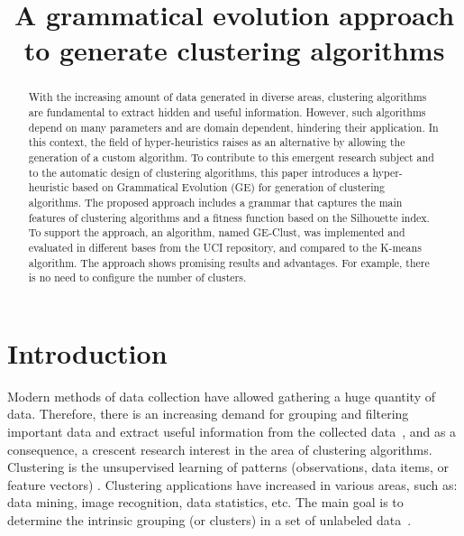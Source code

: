 \documentclass[conference]{IEEEtran}
\begin{document}
	
	\title{A grammatical evolution approach to generate clustering algorithms}
	
	
	\author{
		
		
		
	}
	
	\maketitle
	
	\begin{abstract} 
		
		With the increasing amount of data generated in diverse areas, clustering algorithms are fundamental to extract hidden and useful information. However, such algorithms depend on many parameters and are domain dependent, hindering their application. In this context, the field of hyper-heuristics raises as an alternative by allowing the generation of a custom algorithm. To contribute to this emergent research subject and to the automatic design of clustering algorithms, this paper introduces a hyper-heuristic based on Grammatical Evolution (GE) for generation of clustering algorithms. The proposed approach includes a grammar that captures the main features of clustering algorithms and a fitness function based on the Silhouette index. To support the approach, an algorithm, named GE-Clust, was implemented and evaluated in different bases from the UCI repository, and compared to the K-means algorithm. The approach  shows promising results  and advantages. For example, there is no need to configure the number of clusters.
	\end{abstract}
	
	
	\IEEEpeerreviewmaketitle
	
	
	\section{Introduction}
	
	
	Modern methods of data collection have allowed gathering a huge quantity of data. Therefore, there is an increasing demand for grouping and filtering important data and extract useful information from the collected data~\cite{ahalya2015data}, and as a consequence, a crescent research interest in the area of clustering algorithms. Clustering is the unsupervised learning of patterns (observations, data items, or feature vectors) \cite{jain1988algorithms}. Clustering applications have increased in various areas, such as: data mining, image recognition, data statistics, etc. The main goal is to determine the intrinsic grouping (or clusters) in a set of unlabeled data~\cite{ahalya2015data}.
	
\end{document}
